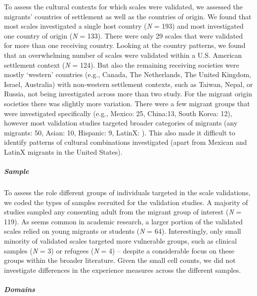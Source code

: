 To assess the cultural contexts for which scales were validated, we
assessed the migrants' countries of settlement as well as the countries
of origin. We found that most scales investigated a single host country
(\textit{N} = 193) and most investigated one country of origin
(\textit{N} = 133). There were only 29 scales that were validated for
more than one receiving country. Looking at the country patterns, we
found that an overwhelming number of scales were validated within a U.S.
American settlement context (\textit{N} = 124). But also the remaining
receiving societies were mostly `western' countries (e.g., Canada, The
Netherlands, The United Kingdom, Israel, Australia) with non-western
settlement contexts, such as Taiwan, Nepal, or Russia, not being
investigated across more than two study. For the migrant origin
societies there was slightly more variation. There were a few migrant
groups that were investigated specifically (e.g., Mexico: 25, China:13,
South Korea: 12), however most validation studies targeted broader
categories of migrants (any migrants: 50, Asian: 10, Hispanic: 9,
LatinX: ). This also made it difficult to identify patterns of cultural
combinations investigated (apart from Mexican and LatinX migrants in the
United States).

\subparagraph{Sample}

To assess the role different groups of individuals targeted in the scale
validations, we coded the types of samples recruited for the validation
studies. A majority of studies sampled any consenting adult from the
migrant group of interest (\textit{N} = 119). As seems common in
academic research, a larger portion of the validated scales relied on
young migrants or students (\textit{N} = 64). Interestingly, only small
minority of validated scales targeted more vulnerable groups, such as
clinical samples (\textit{N} = 3) or refugees (\textit{N} = 4) --
despite a considerable focus on these groups within the broader
literature. Given the small cell counts, we did not investigate
differences in the experience measures across the different samples.

\subparagraph{Domains}

